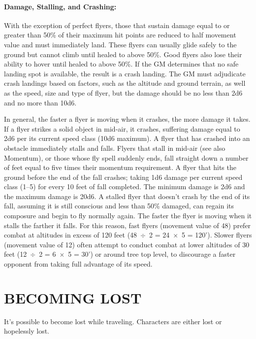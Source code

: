\begin{multicols}{2}
\paragraph{Damage, Stalling, and Crashing:} With the exception of perfect flyers, those that sustain damage equal to or greater than 50\% of their maximum hit points are reduced to half movement value and must immediately land.  These flyers can usually glide safely to the ground but cannot climb until healed to above 50\%.  Good flyers also lose their ability to hover until healed to above 50\%.  If the GM determines that no safe landing spot is available, the result is a crash landing.  The GM must adjudicate crash landings based on factors, such as the altitude and ground terrain, as well as the speed, size and type of flyer, but the damage should be no less than 2d6 and no more than 10d6. 

In general, the faster a flyer is moving when it crashes, the more damage it takes.  If a flyer strikes a solid object in mid-air, it crashes, suffering damage equal to 2d6 per its current speed class (10d6 maximum).  A flyer that has crashed into an obstacle immediately stalls and falls.  Flyers that stall in mid-air (see also Momentum), or those whose fly spell suddenly ends, fall straight down a number of feet equal to five times their momentum requirement.  A flyer that hits the ground before the end of the fall crashes; taking 1d6 damage per current speed class (1--5) for every 10 feet of fall completed.  The minimum damage is 2d6 and the maximum damage is 20d6.  A stalled flyer that doesn't crash by the end of its fall, assuming it is still conscious and less than 50\% damaged, can regain its composure and begin to fly normally again.  The faster the flyer is moving when it stalls the farther it falls. For this reason, fast flyers (movement value of 48) prefer combat at altitudes in excess of 120 feet (48~$\div$~2 = 24~$\times$~5 = 120').  Slower flyers (movement value of 12) often attempt to conduct combat at lower altitudes of 30 feet (12~$\div$~2 = 6~$\times$~5 = 30') or around tree top level, to discourage a faster opponent from taking full advantage of its speed.

\section{BECOMING LOST}

It's possible to become lost while traveling.  Characters are either lost or hopelessly lost.


\end{multicols}
